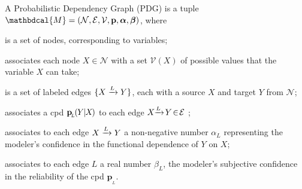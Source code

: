 \documentclass[twoside]{article}
\theoremstyle{plain}
\theoremstyle{definition}
\newcommand{\mat}[1]{\mathbf{#1}}
\newcommand{\ssub}[1]{_{\!_{#1}\!}}
\newcommand{\bp}[1][L]{\mat{p}\ssub{#1}}
\newcommand{\V}{\mathcal V}
\newcommand{\N}{\mathcal N}
\newcommand{\Ed}{\mathcal E}
\newcommand{\dg}[1]{\mathbdcal{#1}}
\newcommand{\ed}[3]{%
		\mathchoice%
		{#2\overset{\smash{\mskip-5mu\raisebox{-3pt}{${#1}$}}}{\xrightarrow{\hphantom{\scriptstyle {#1}}}} #3} %
		{#2\overset{\smash{\mskip-5mu\raisebox{-3pt}{$\scriptstyle {#1}$}}}{\xrightarrow{\hphantom{\scriptstyle {#1}}}} #3}%
		{#2\overset{\smash{\mskip-5mu\raisebox{-3pt}{$\scriptscriptstyle {#1}$}}}{\xrightarrow{\hphantom{\scriptscriptstyle {#1}}}} #3} %
		{#2\overset{\smash{\mskip-5mu\raisebox{-3pt}{$\scriptscriptstyle {#1}$}}}{\xrightarrow{\hphantom{\scriptscriptstyle {#1}}}} #3}} %
\begin{document}
\begin{defn}
    \label{defn:pdg}
	A Probabilistic Dependency Graph (PDG) is a tuple $\dg M = (\N,\Ed,\V,\mat p, \boldsymbol\alpha, \boldsymbol\beta)$, where
    \vspace{-1em}
	\begin{description}[leftmargin=1em,labelindent=1.5em,itemsep=0pt]
		\item[$\N$]
			is a set of nodes, corresponding to variables;
        \item[$\V$]
			associates each node $X \in \N$ with a set $\V(X)$ of possible values that the variable $X$ can take;
		\item[$\Ed$]
			is a set of labeled  edges $\{ \ed LXY \}$, each with a source
			$X$ and target $Y$ from $\N$;

		\item[$\mat p$]
		associates 
        a cpd $\bp(\mskip-1muY\mskip-1mu|\mskip-1muX\mskip-2mu)$
        to each edge $\ed L{X\!\!}{\!Y} \!\in\! \Ed$%
        ;
	\item[$\boldsymbol\alpha$]
	associates to each edge $\ed L{X}{Y}$ a non-negative number $\alpha_L$
    representing
    the modeler's confidence in the functional dependence of $Y$ on $X$;
    
	\item[$\boldsymbol\beta$]
	associates to each edge $L$ a real number $\beta_L$,
	the modeler's subjective confidence in the reliability of
	the cpd
	$\bp$.%
    \qedhere
	\end{description}%
\end{defn}
\end{document}
